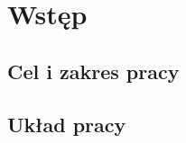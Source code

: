 \chapter{Wstęp}
\label{section:entry}

\section{Cel i zakres pracy}
\label{section:cel_i_zakres_pracy}

\section{Układ pracy}

